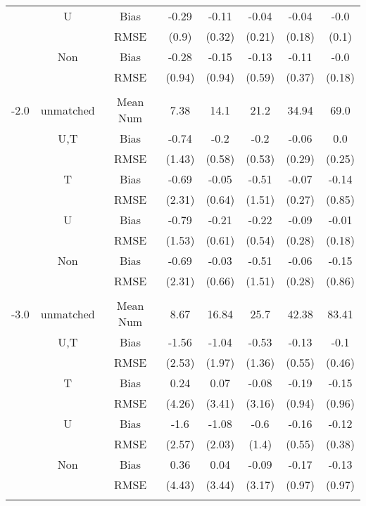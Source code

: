 \begin{tabular}{@{\extracolsep{5pt}}lc|cccccc}
 & U & Bias & -0.29 & -0.11 & -0.04 & -0.04 & -0.0 \\
 &  & RMSE & (0.9) & (0.32) & (0.21) & (0.18) & (0.1) \\
 & Non & Bias & -0.28 & -0.15 & -0.13 & -0.11 & -0.0 \\
 &  & RMSE & (0.94) & (0.94) & (0.59) & (0.37) & (0.18) \\
 &  &  &  &  &  &  &  \\
-2.0 & unmatched & Mean Num & 7.38 & 14.1 & 21.2 & 34.94 & 69.0 \\
 & U,T & Bias & -0.74 & -0.2 & -0.2 & -0.06 & 0.0 \\
 &  & RMSE & (1.43) & (0.58) & (0.53) & (0.29) & (0.25) \\
 & T & Bias & -0.69 & -0.05 & -0.51 & -0.07 & -0.14 \\
 &  & RMSE & (2.31) & (0.64) & (1.51) & (0.27) & (0.85) \\
 & U & Bias & -0.79 & -0.21 & -0.22 & -0.09 & -0.01 \\
 &  & RMSE & (1.53) & (0.61) & (0.54) & (0.28) & (0.18) \\
 & Non & Bias & -0.69 & -0.03 & -0.51 & -0.06 & -0.15 \\
 &  & RMSE & (2.31) & (0.66) & (1.51) & (0.28) & (0.86) \\
 &  &  &  &  &  &  &  \\
-3.0 & unmatched & Mean Num & 8.67 & 16.84 & 25.7 & 42.38 & 83.41 \\
 & U,T & Bias & -1.56 & -1.04 & -0.53 & -0.13 & -0.1 \\
 &  & RMSE & (2.53) & (1.97) & (1.36) & (0.55) & (0.46) \\
 & T & Bias & 0.24 & 0.07 & -0.08 & -0.19 & -0.15 \\
 &  & RMSE & (4.26) & (3.41) & (3.16) & (0.94) & (0.96) \\
 & U & Bias & -1.6 & -1.08 & -0.6 & -0.16 & -0.12 \\
 &  & RMSE & (2.57) & (2.03) & (1.4) & (0.55) & (0.38) \\
 & Non & Bias & 0.36 & 0.04 & -0.09 & -0.17 & -0.13 \\
 &  & RMSE & (4.43) & (3.44) & (3.17) & (0.97) & (0.97) \\
 &  &  &  &  &  &  &  \\
\hline 
\bottomrule 
\end{tabular}
